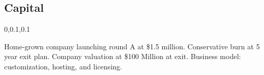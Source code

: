 
\begin{frame}{}
\section{Capital}
\vspace{-.5em}	

{\Large{}\selectfont

\hspace*{20pt}\begin{minipage}{.94\textwidth}
\vspace{4pt}
		
\begin{lightquadblockc}{0,0.1,0.1}{\parbox{21cm}{\centering \vspace{3pt}}}
\begin{center}\begin{minipage}{\textwidth}
{\Huge \setlength{\leftmargini}{30pt}\begin{enumerate}
\dmitem Home-grown company launching round A at \$1.5 million.
\vspace{20pt}
\dmitem Conservative burn at 5 year exit plan.
\vspace{20pt}
\dmitem Company valuation at \$100 Million at exit.
\footnotemark[1]
\vspace{20pt}
\dmitem Business model: customization, hosting, and licensing.
\vspace{20pt}
\footnotemark[2]
\end{enumerate}
}\end{minipage}
\end{center}
\end{lightquadblockc}
\end{minipage}

}

\end{frame}
